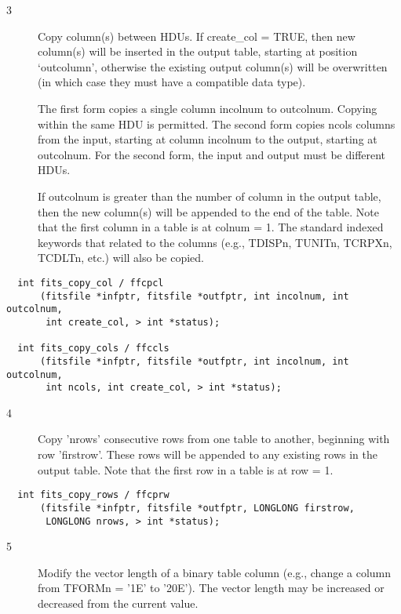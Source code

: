 \documentclass[11pt]{book}
\begin{document}
\begin{description}
\item[3 ] Copy column(s) between HDUs.  If create\_col = TRUE, then
    new column(s) will be inserted in the output table, starting at
    position `outcolumn', otherwise the existing output column(s) will
    be overwritten (in which case they must have a compatible data
    type).

    The first form copies a single column incolnum to outcolnum.
    Copying within the same HDU is permitted.  The second form copies
    ncols columns from the input, starting at column incolnum to the
    output, starting at outcolnum.  For the second form, the input and
    output must be different HDUs.

    If outcolnum is greater than the number of column in the output table, then
    the new column(s) will be appended to the end of the table.
    Note that the first column in a table is at colnum = 1.
    The standard indexed keywords that related to the columns (e.g., TDISPn,
    TUNITn, TCRPXn, TCDLTn, etc.) will also be copied. \label{ffcpcl} \label{ffccls}
\end{description}

\begin{verbatim}
  int fits_copy_col / ffcpcl
      (fitsfile *infptr, fitsfile *outfptr, int incolnum, int outcolnum,
       int create_col, > int *status);

  int fits_copy_cols / ffccls
      (fitsfile *infptr, fitsfile *outfptr, int incolnum, int outcolnum, 
       int ncols, int create_col, > int *status);
\end{verbatim}

\begin{description}
\item[4 ] Copy 'nrows' consecutive rows from one table to another, beginning
    with row 'firstrow'.  These rows will be appended to any existing
    rows in the output table.
   Note that the first row in a table is at row = 1. \label{ffcprw}
\end{description}

\begin{verbatim}
  int fits_copy_rows / ffcprw
      (fitsfile *infptr, fitsfile *outfptr, LONGLONG firstrow,
       LONGLONG nrows, > int *status);
\end{verbatim}

\begin{description}
\item[5 ] Modify the vector length of a binary table column (e.g.,
    change a column from TFORMn = '1E' to '20E').  The vector
   length may be increased or decreased from the current value. \label{ffmvec}
\end{description}
\end{document}
